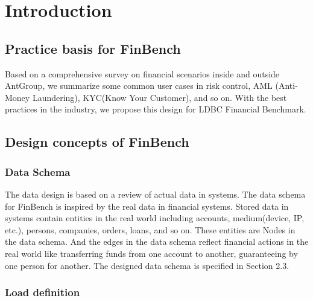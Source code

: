 \chapter{Introduction}
\label{sec:introduction}


\section{Practice basis for FinBench}

Based on a comprehensive survey on financial scenarios inside and outside
AntGroup, we summarize some common user cases in risk control, AML (Anti-Money
Laundering), KYC(Know Your Customer), and so on. With the best practices in the
industry, we propose this design for LDBC Financial Benchmark.


\section{Design concepts of FinBench}

\subsection{Data Schema}

The data design is based on a review of actual data in systems. The data schema
for FinBench is inspired by the real data in financial systems. Stored data in
systems contain entities in the real world including accounts, medium(device,
IP, etc.), persons, companies, orders, loans, and so on. These entities are
Nodes in the data schema. And the edges in the data schema reflect financial
actions in the real world like transferring funds from one account to another,
guaranteeing by one person for another. The designed data schema is specified in
Section 2.3.

\subsection{Load definition}

